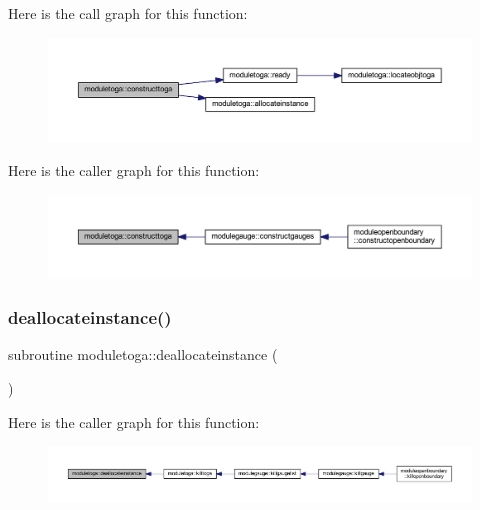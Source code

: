 Here is the call graph for this function\+:\nopagebreak
\begin{figure}[H]
\begin{center}
\leavevmode
\includegraphics[width=350pt]{namespacemoduletoga_a49f980ff51e54f1045b60179a9ab5226_cgraph}
\end{center}
\end{figure}
Here is the caller graph for this function\+:\nopagebreak
\begin{figure}[H]
\begin{center}
\leavevmode
\includegraphics[width=350pt]{namespacemoduletoga_a49f980ff51e54f1045b60179a9ab5226_icgraph}
\end{center}
\end{figure}
\mbox{\label{namespacemoduletoga_a0c38f2a3f8f7a4b798bbc4b523196742}} 
\subsubsection{\texorpdfstring{deallocateinstance()}{deallocateinstance()}}
{\footnotesize\ttfamily subroutine moduletoga\+::deallocateinstance (\begin{DoxyParamCaption}{ }\end{DoxyParamCaption})\hspace{0.3cm}{\ttfamily [private]}}

Here is the caller graph for this function\+:\nopagebreak
\begin{figure}[H]
\begin{center}
\leavevmode
\includegraphics[width=350pt]{namespacemoduletoga_a0c38f2a3f8f7a4b798bbc4b523196742_icgraph}
\end{center}
\end{figure}
\mbox{\label{namespacemoduletoga_a9aa03039890445420290aa3feba13a89}} 
